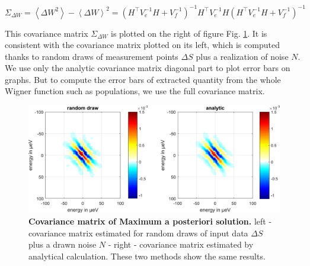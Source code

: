 \begin{equation}
\Sigma_{\Delta W} = \left<\Delta W^{2}\right>-\left<\Delta W\right>^{2} = \left(H^{\top}V^{-1}_{e}H+V^{-1}_{f}\right)^{-1}H^{\top}V^{-1}_{e}H\left(H^{\top}V^{-1}_{e}H+V^{-1}_{f}\right)^{-1} \label{eq: MAP covariance}
\end{equation}

This covariance matrix $\Sigma_{\Delta W}$ is plotted on the right of figure Fig. \ref{fig: MAP_covariance}. It is consistent with the covariance matrix plotted on its left, which is computed thanks to random draws of measurement points $\Delta S$ plus a realization of noise $N$. We use only the analytic covariance matrix diagonal part to plot error bars on graphs. But to compute the error bars of extracted quantity from the whole Wigner function such as populations, we use the full covariance matrix.

\begin{figure}[hptb]
	\begin{center}		
	\includegraphics[width = 12 cm]{./appA/MAP_covariance}
	\end{center}
	\caption{\textbf{Covariance matrix of Maximum a posteriori solution.} left - covariance matrix estimated for random draws of input data $\Delta S$ plus a drawn noise $N$ - right - covariance matrix estimated by analytical calculation. These two methods show the same results.}
	\label{fig: MAP_covariance}
\end{figure}





